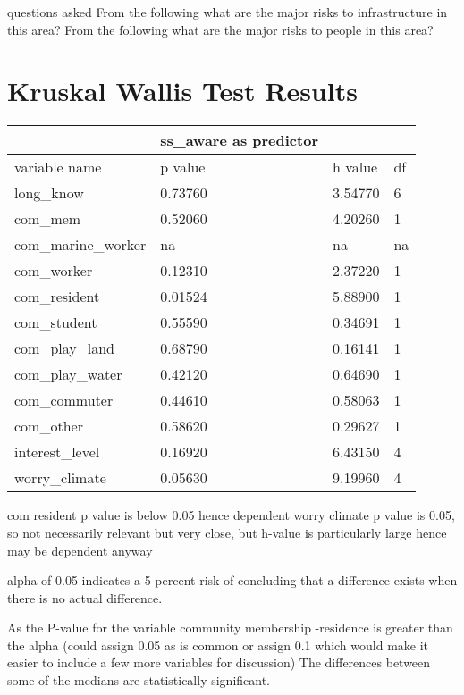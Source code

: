 questions asked From the following what are the major risks to infrastructure in this area?
From the following what are the major risks to people in this area?


\section{Kruskal Wallis Test Results}
\begin{table}[!ht]
    \centering
    \begin{tabular}{|l|l|l|l|}
    \hline
         ~ & ss\_aware as predictor & ~ & ~ \\ \hline
        variable name & p value & h value & df \\ \hline
           long\_know & 0.73760 & 3.54770 & 6 \\ \hline
        com\_mem & 0.52060 & 4.20260 & 1 \\ \hline
        com\_marine\_worker & na & na & na \\ \hline
        com\_worker & 0.12310 & 2.37220 & 1 \\ \hline
        com\_resident & 0.01524 & 5.88900 & 1 \\ \hline
        com\_student & 0.55590 & 0.34691 & 1 \\ \hline
        com\_play\_land & 0.68790 & 0.16141 & 1 \\ \hline
        com\_play\_water & 0.42120 & 0.64690 & 1 \\ \hline
        com\_commuter & 0.44610 & 0.58063 & 1 \\ \hline
        com\_other & 0.58620 & 0.29627 & 1 \\ \hline
        interest\_level & 0.16920 & 6.43150 & 4 \\ \hline
        worry\_climate & 0.05630 & 9.19960 & 4 \\ \hline
    \end{tabular}
\end{table}
com resident p value is below 0.05 hence dependent
worry climate p value is 0.05, so not necessarily relevant but very close, but h-value is particularly large hence may be dependent anyway

alpha of 0.05 indicates a 5 percent
risk of concluding that a difference exists when there is no actual difference.

As the P-value for the variable community membership -residence is greater than the alpha (could assign 0.05 as is common or assign 0.1 which would make it easier to include a few more variables for discussion) The differences between some of the medians are statistically significant.

